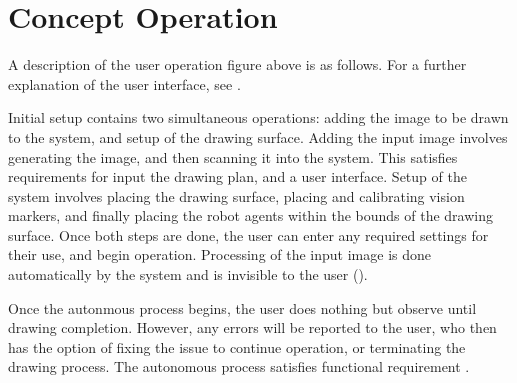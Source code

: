 
\section{Concept Operation}
\label{sec:concept_operation}



A description of the user operation figure above is as follows. For a further explanation of the user interface, see .

Initial setup contains two simultaneous operations: adding the image to be drawn to the system, and setup of the drawing surface. Adding the input image involves generating the image, and then scanning it into the system. This satisfies requirements for input the drawing plan, and a user interface. Setup of the system involves placing the drawing surface, placing and calibrating vision markers, and finally placing the robot agents within the bounds of the drawing surface. Once both steps are done, the user can enter any required settings for their use, and begin operation. Processing of the input image is done automatically by the system and is invisible to the user ().

Once the autonmous process begins, the user does nothing but observe until drawing completion. However, any errors will be reported to the user, who then has the option of fixing the issue to continue operation, or terminating the drawing process. The autonomous process satisfies functional requirement .
